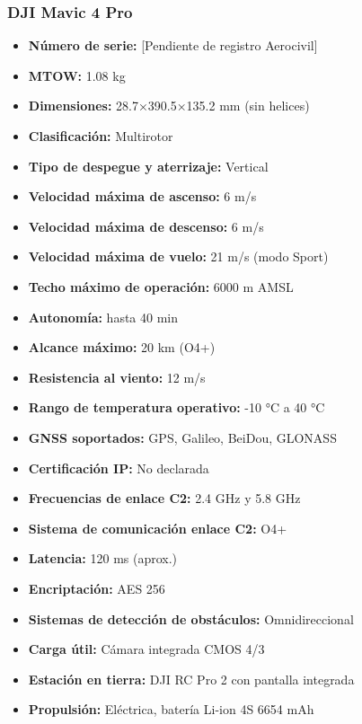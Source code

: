 
\subsubsection*{DJI Mavic 4 Pro}
\begin{itemize}
    \item \textbf{Número de serie:} [Pendiente de registro Aerocivil]
    \item \textbf{MTOW:} 1.08 kg
    \item \textbf{Dimensiones:} 28.7×390.5×135.2 mm (sin helices)
    \item \textbf{Clasificación:} Multirotor 
    \item \textbf{Tipo de despegue y aterrizaje:} Vertical
    \item \textbf{Velocidad máxima de ascenso:} 6 m/s
    \item \textbf{Velocidad máxima de descenso:} 6 m/s
    \item \textbf{Velocidad máxima de vuelo:} 21 m/s (modo Sport)
    \item \textbf{Techo máximo de operación:} 6000 m AMSL
    \item \textbf{Autonomía:} hasta 40 min
    \item \textbf{Alcance máximo:} 20 km (O4+)
    \item \textbf{Resistencia al viento:} 12 m/s
    \item \textbf{Rango de temperatura operativo:} -10 °C a 40 °C
    \item \textbf{GNSS soportados:} GPS, Galileo, BeiDou, GLONASS
    \item \textbf{Certificación IP:} No declarada
    \item \textbf{Frecuencias de enlace C2:} 2.4 GHz y 5.8 GHz
    \item \textbf{Sistema de comunicación enlace C2:} O4+
    \item \textbf{Latencia:} 120 ms (aprox.)
    \item \textbf{Encriptación:} AES 256
    \item \textbf{Sistemas de detección de obstáculos:} Omnidireccional
    \item \textbf{Carga útil:} Cámara integrada CMOS 4/3
    \item \textbf{Estación en tierra:} DJI RC Pro 2 con pantalla integrada
    \item \textbf{Propulsión:} Eléctrica, batería Li-ion 4S 6654 mAh
\end{itemize}

